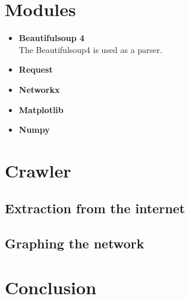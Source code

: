 \documentclass[10pt]{article}
\begin{document}
\section{Modules}

 \begin{itemize}
        \item \textbf{Beautifulsoup 4}\\
 The Beautifulsoup4 is used as a parser.
        \item \textbf{Request}
        \item \textbf{Networkx}
        \item \textbf{Matplotlib}
        \item \textbf{Numpy}
    \end{itemize}
 

\section{Crawler}
\subsection{Extraction from the internet}
\subsection{Graphing the network}
\section{Conclusion}



% 
%
\end{document}
